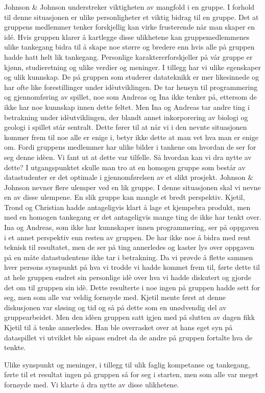 Johnson \& Johnson  \cite{Johnson} understreker viktigheten av mangfold
i en gruppe. I forhold til denne situasjonen er ulike personligheter et
viktig bidrag til en gruppe. Det at gruppens medlemmer tenker
forskjellig kan virke frusterende når man skaper en idé. Hvis gruppen
klarer å kartlegge disse ulikhetene kan gruppemedlemmenes ulike
tankegang bidra til å skape noe større og bredere enn hvis alle på
gruppen hadde hatt helt lik tankegang. Personlige karaktererforskjeller
på vår gruppe er kjønn, studieretning og ulike verdier og meninger. I
tillegg har vi ulike egenskaper og ulik kunnskap. De på gruppen som
studerer datateknikk er mer likesinnede og har ofte like forestillinger
under idèutviklingen. De tar hensyn til programmering og gjennomføring
av spillet, noe som Andreas og Ina ikke tenker på, ettersom de ikke har
noe kunnskap innen dette feltet. Men Ina og Andreas tar andre ting i
betrakning under idèutviklingen, der blandt annet inkorporering av
biologi og geologi i spillet står sentralt. Dette fører til at når vi i
den nevnte situasjonen kommer frem til noe alle er enige i, betyr ikke
dette at man vet hva man er enige om. Fordi gruppens medlemmer har ulike
bilder i tankene om hvordan de ser for seg denne idèen. Vi fant ut at
dette var tilfelle. Så hvordan kan vi dra nytte av dette?  I
utgangspunktet skulle man tro at en homogen gruppe som består av
datastudenter er det optimale i gjennomførelsen av et slikt prosjekt.
Johnson \& Johnson nevner flere ulemper ved en lik gruppe. I denne
situasjonen skal vi nevne en av disse ulempene. En slik gruppe kan
mangle et bredt perspektiv. Kjetil, Trond og Christian hadde
antageligvis klart å lage et kjempebra produkt, men med en homogen
tankegang er det antageligvis mange ting de ikke har tenkt over. Ina og
Andreas, som ikke har kunnskaper innen programmering, ser på oppgaven i
et annet perspektiv enn resten av gruppen. De har ikke noe å bidra med
rent teknisk til resultatet, men de ser på ting annerledes og kaster lys
over oppgaven på en måte datastudentene ikke tar i betrakning. Da vi
prøvde å flette sammen hver persons synspunkt på hva vi trodde vi hadde
kommet frem til, førte dette til at hele gruppen endret sin personlige
idè over hva vi hadde diskutert og gjorde det om til gruppen sin idè.
Dette resulterte i noe ingen på gruppen hadde sett for seg, men som alle
var veldig fornøyde med.  Kjetil mente først at denne diskusjonen var
sløsing og tid og så på dette som en unødvendig del av gruppearbeidet.
Men den idèen gruppen satt igjen med på slutten av dagen fikk Kjetil til
å tenke annerledes. Han ble overrasket over at hans eget syn på
dataspillet vi utviklet ble såpass endret da de andre på gruppen
fortalte hva de tenkte. 

Ulike synspunkt og meninger, i tillegg til ulik faglig kompetanse og
tankegang, førte til et resultat ingen på gruppen så for seg i starten,
men som alle var meget fornøyde med. Vi klarte å dra nytte av disse
ulikhetene.

